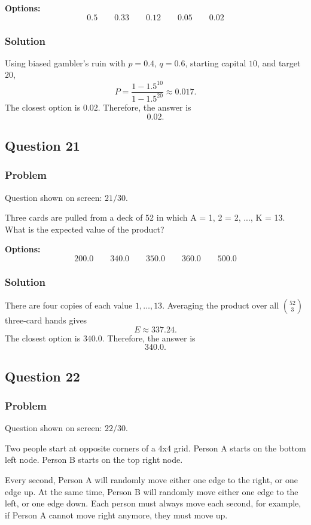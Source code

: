 \documentclass[12pt]{article}
\begin{document}
\noindent\textbf{Options:}
\[
\boxed{0.5}
\qquad
\boxed{0.33}
\qquad
\boxed{0.12}
\qquad
\boxed{0.05}
\qquad
\boxed{0.02}
\]

\subsubsection{Solution}
Using biased gambler's ruin with \(p=0.4\), \(q=0.6\), starting capital \(10\), and target \(20\),
\[
P=\frac{1-1.5^{10}}{1-1.5^{20}}\approx 0.017.
\]
The closest option is \(0.02\). Therefore, the answer is
\[
\boxed{0.02}.
\]

\subsection{Question 21}
\subsubsection{Problem}
Question shown on screen: \(21/30\).

Three cards are pulled from a deck of 52 in which A = 1, 2 = 2, ..., K = 13. What is the expected value of the product?

\noindent\textbf{Options:}
\[
\boxed{200.0}
\qquad
\boxed{340.0}
\qquad
\boxed{350.0}
\qquad
\boxed{360.0}
\qquad
\boxed{500.0}
\]

\subsubsection{Solution}
There are four copies of each value \(1,\ldots,13\). Averaging the product over all \(\binom{52}{3}\) three-card hands gives
\[
E\approx 337.24.
\]
The closest option is \(340.0\). Therefore, the answer is
\[
\boxed{340.0}.
\]

\subsection{Question 22}
\subsubsection{Problem}
Question shown on screen: \(22/30\).

Two people start at opposite corners of a 4x4 grid. Person A starts on the bottom left node. Person B starts on the top right node.

Every second, Person A will randomly move either one edge to the right, or one edge up. At the same time, Person B will randomly move either one edge to the left, or one edge down. Each person must always move each second, for example, if Person A cannot move right anymore, they must move up.
\end{document}
